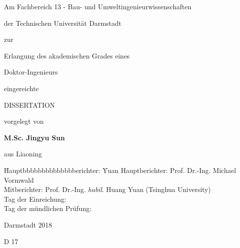 %

\begin{titlepage}                  %
\renewcommand{\baselinestretch}{1.0}
\begin{center}

    {\bf\huge{} \par}
    {\bf\huge{} \par}
    {\bf\huge{} \par}

\vspace*{20mm}
    {{Am Fachbereich 13 - Bau- und Umweltingenieurwissenschaften\par}}
    {{der Technischen Universit\"{a}t Darmstadt \par}}


\vspace*{10mm}
    {{zur \par}}
    {{Erlangung des akademischen Grades eines \par}}
    {{Doktor-Ingenieurs \par}}


\vspace*{10mm}
    {{eingereichte} \par}
    {{DISSERTATION} \par}


\vspace*{25mm}
    {{vorgelegt von} \par}
\vspace*{2mm}
    {{\large \bf M.Sc. Jingyu Sun} \par}
\vspace*{2mm}
    {{aus Liaoning \par}}


\vspace*{25mm}
{
\begin{tabbing}
\hspace*{10mm}
\=Hauptbbbbbbbbbbbbbberichter: \=Yuan\kill
\>Hauptberichter: \>Prof. Dr.-Ing. Michael Vormwald\\
\>Mitberichter: \> Prof. Dr.-Ing. \emph{habil}. Huang Yuan (Tsinghua University)\\
\>Tag der Einreichung:\>\\
\>Tag der m\"{u}ndlichen Pr\"{u}fung:\>\\
\end{tabbing}
}

\vspace*{10mm}
	{{Darmstadt 2018} \par}
    {{D 17} \par}



\end{center}

\end{titlepage}
